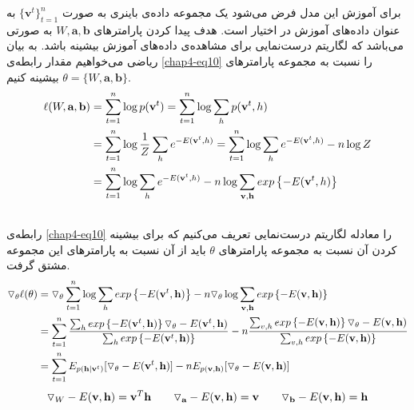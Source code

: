 برای آموزش این مدل فرض می‌‌شود یک مجموعه داده‌ی باینری به صورت
$\{\textbf{v}^{t}\}_{t=1}^{n}$
به عنوان داده‌های آموزش در اختیار است. هدف پیدا کردن پارامتر‌های
$W, \textbf{a}, \textbf{b}$
به صورتی‌ می‌‌باشد که لگاریتم درست‌نمایی برای مشاهده‌ی داده‌های آموزش بیشینه باشد. به بیان ریاضی‌ می‌‌خواهیم مقدار رابطه‌ی
\ref{chap4-eq10}
را نسبت به مجموعه پارامتر‌های
$\theta = \{W, \textbf{a}, \textbf{b}\}$
بیشینه کنیم.
\begin{align}
	\centering
	\label{chap4-eq10}
	\ell(W, \textbf{a}, \textbf{b}) &= \sum_{t=1}^{n}\log p(\textbf{v}^t) = \sum_{t=1}^{n}\log \sum_h p(\textbf{v}^t, h)\\\nonumber
									&= \sum_{t=1}^{n}\log\dfrac{1}{Z} \sum_h e^{-E(\textbf{v}^t,h)} = \sum_{t=1}^{n}\log \sum_h e^{-E(\textbf{v}^t,h)} - n\log Z\\\nonumber
									&= \sum_{t=1}^{n}\log\sum_h e^{-E(\textbf{v}^t,h)} - n\log\sum_{\textbf{v},\textbf{h}}exp\left\lbrace -E(\textbf{v}^t,h)\right\rbrace\\\nonumber
\end{align}
رابطه‌ی
\ref{chap4-eq10}
را معاد‌له لگاریتم درست‌نمایی تعریف می‌‌کنیم که برای بیشینه کردن آن نسبت به مجموعه پارامتر‌های
$\theta$
باید از آن نسبت به پارامترهای این مجموعه مشتق گرفت.
\begin{align}
	\centering
	\label{chap4-eq11}
	\triangledown_\theta \ell(\theta) &= \triangledown_\theta \sum_{t=1}^{n} \log \sum_h exp \left\lbrace -E(\textbf{v}^t, \textbf{h}) \right\rbrace - n\triangledown_\theta \log \sum_{\textbf{v}, \textbf{h}} exp \left\lbrace -E(\textbf{v}, \textbf{h}) \right\rbrace \\\nonumber
	&=\sum_{t=1}^{n} \dfrac{\sum_h exp \left\lbrace -E(\textbf{v}^t, \textbf{h}) \right\rbrace \triangledown_\theta -E(\textbf{v}^t, \textbf{h})}{\sum_h exp \left\lbrace -E(\textbf{v}^t, \textbf{h}) \right\rbrace} - n \dfrac{\sum_{v,h} exp \left\lbrace -E(\textbf{v}, \textbf{h}) \right\rbrace \triangledown_\theta -E(\textbf{v}, \textbf{h})}{\sum_{v,h} exp \left\lbrace -E(\textbf{v}, \textbf{h}) \right\rbrace}\\\nonumber
	&=\sum_{t=1}^{n}E_{p(\textbf{h}|\textbf{v}^t)}[\triangledown_\theta -E(\textbf{v}^t, \textbf{h})] - nE_{p(\textbf{v},\textbf{h})}[\triangledown_\theta -E(\textbf{v}, \textbf{h})]
\end{align}
\begin{align}
	\centering
	\label{chap4-eq12}
	\triangledown_{W} -E(\textbf{v},\textbf{h}) = \textbf{v}^T\textbf{h} \qquad  \triangledown_{\textbf{a}} -E(\textbf{v},\textbf{h}) = \textbf{v} \qquad  \triangledown_{\textbf{b}} -E(\textbf{v},\textbf{h}) = \textbf{h}
\end{align}

